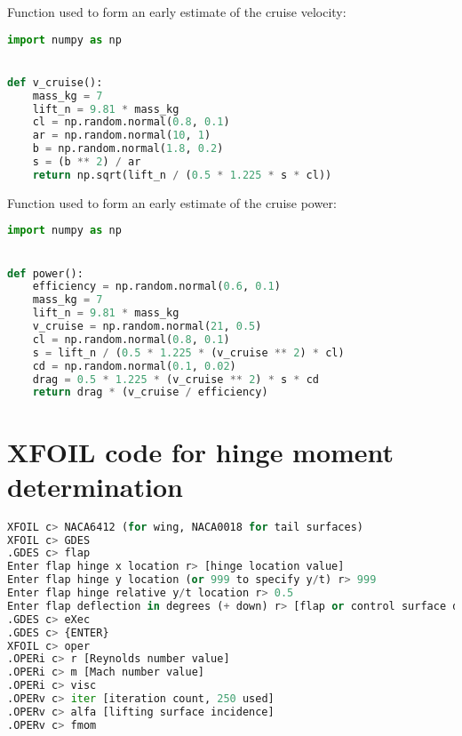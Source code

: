 \documentclass[../main.tex]{subfiles}
\begin{document}
Function used to form an early estimate of the cruise velocity:

\begin{lstlisting}[language=python,firstnumber=1]
import numpy as np


def v_cruise():
    mass_kg = 7
    lift_n = 9.81 * mass_kg
    cl = np.random.normal(0.8, 0.1)
    ar = np.random.normal(10, 1)
    b = np.random.normal(1.8, 0.2)
    s = (b ** 2) / ar
    return np.sqrt(lift_n / (0.5 * 1.225 * s * cl))
\end{lstlisting}

Function used to form an early estimate of the cruise power:

\begin{lstlisting}[language=python,firstnumber=1]
import numpy as np


def power():
    efficiency = np.random.normal(0.6, 0.1)
    mass_kg = 7
    lift_n = 9.81 * mass_kg
    v_cruise = np.random.normal(21, 0.5)
    cl = np.random.normal(0.8, 0.1)
    s = lift_n / (0.5 * 1.225 * (v_cruise ** 2) * cl)
    cd = np.random.normal(0.1, 0.02)
    drag = 0.5 * 1.225 * (v_cruise ** 2) * s * cd
    return drag * (v_cruise / efficiency)
\end{lstlisting}

\section{XFOIL code for hinge moment determination} \label{appendix:xfoil-code}

\begin{lstlisting}[language=python,firstnumber=1]
XFOIL c> NACA6412 (for wing, NACA0018 for tail surfaces) 
XFOIL c> GDES 
.GDES c> flap 
Enter flap hinge x location r> [hinge location value] 
Enter flap hinge y location (or 999 to specify y/t) r> 999 
Enter flap hinge relative y/t location r> 0.5 
Enter flap deflection in degrees (+ down) r> [flap or control surface deflection value] 
.GDES c> eXec 
.GDES c> {ENTER} 
XFOIL c> oper 
.OPERi c> r [Reynolds number value] 
.OPERi c> m [Mach number value] 
.OPERi c> visc 
.OPERv c> iter [iteration count, 250 used] 
.OPERv c> alfa [lifting surface incidence] 
.OPERv c> fmom 
\end{lstlisting}
\end{document}
